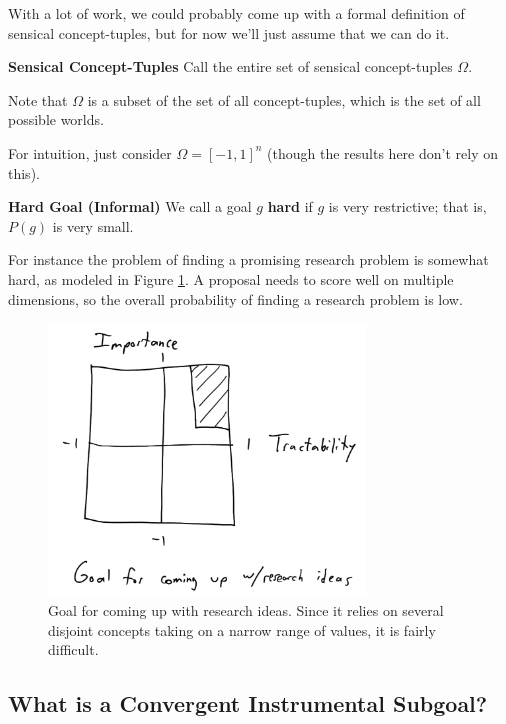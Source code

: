 \documentclass{article}
\begin{document}
With a lot of work, we could probably come up with a formal definition of sensical concept-tuples, but for now we'll just assume that we can do it.

\begin{definition}{\textbf{Sensical Concept-Tuples}}
    Call the entire set of sensical concept-tuples $\Omega$.
\end{definition}

Note that $\Omega$ is a subset of the set of all concept-tuples, which is the set of all possible worlds.


For intuition, just consider $\Omega=[-1,1]^n$ (though the results here don't rely on this).

\begin{definition}{\textbf{Hard Goal (Informal)}}
    We call a goal $g$ \textbf{hard} if $g$ is very restrictive; that is, $P(g)$ is very small.
\end{definition}

For instance the problem of finding a promising research problem is somewhat hard, as modeled in Figure \ref{fig:goal-research}. A proposal needs to score well on multiple dimensions, so the overall probability of finding a research problem is low.

\begin{figure}[ht]
    \centering
    \includegraphics[width=0.75\textwidth]{pics/goal-research.png} 
    \caption{Goal for coming up with research ideas. Since it relies on several disjoint concepts taking on a narrow range of values, it is fairly difficult.}
    \label{fig:goal-research} 
\end{figure}

\subsection{What is a Convergent Instrumental Subgoal?}
\end{document}
